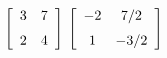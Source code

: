 {$\left[ \begin {array}{cc} 3&7\\\noalign{\medskip}2&4\end {array}
 \right] $
 }
{$\left[ \begin {array}{cc} -2&7/2\\\noalign{\medskip}1&-3/2\end {array}
 \right] $}
